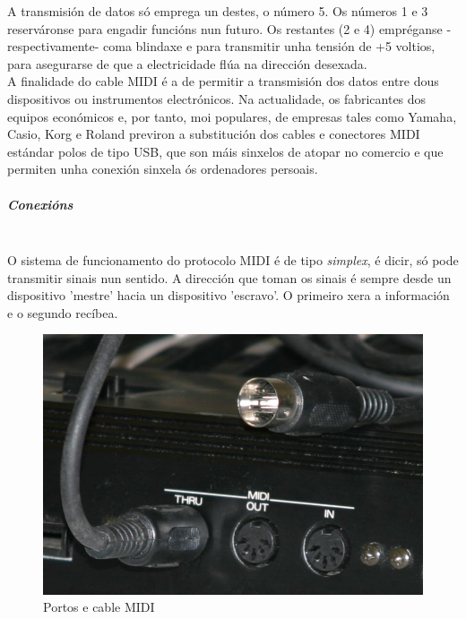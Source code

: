     A transmisión de datos só emprega un destes, o número 5. Os números 1 e 3
    reserváronse para engadir funcións nun futuro. Os restantes (2 e 4)
    empréganse -respectivamente- coma blindaxe e para transmitir unha tensión
    de +5 voltios, para asegurarse de que a electricidade flúa na dirección
    desexada. \\

    A finalidade do cable MIDI é a de permitir a transmisión dos datos entre
    dous dispositivos ou instrumentos electrónicos. Na actualidade, os
    fabricantes dos equipos económicos e, por tanto, moi populares, de empresas
    tales como Yamaha, Casio, Korg e Roland previron a substitución dos cables
    e conectores MIDI estándar polos de tipo USB, que son máis sinxelos de
    atopar no comercio e que permiten unha conexión sinxela ós ordenadores
    persoais.

    \subparagraph{Conexións}\mbox{}\\

    O sistema de funcionamento do protocolo MIDI é de tipo \textit{simplex}, é
    dicir, só pode transmitir sinais nun sentido. A dirección que toman os
    sinais é sempre desde un dispositivo 'mestre' hacia un dispositivo
    'escravo'. O primeiro xera a información e o segundo recíbea.

    \begin{figure}[htbp]
     \centering
     \includegraphics[scale=0.3,keepaspectratio=true]{./imagenes/wikipedia-puertos-midi.jpg}
     \caption[Portos e cable MIDI]{Portos e cable MIDI \cite{WikipediaMIDI}}
     \label{figura:WikipediaPortosMIDI}
    \end{figure}

